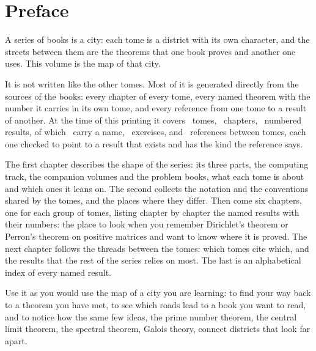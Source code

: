\chapter*{Preface}
A series of books is a city: each tome is a district with its own character, and the streets between them are the
theorems that one book proves and another one uses. This volume is the map of that city.

It is not written like the other tomes. Most of it is generated directly from the sources of the books: every
chapter of every tome, every named theorem with the number it carries in its own tome, and every reference from
one tome to a result of another. At the time of this printing it covers \statTomes\ tomes, \statChapters\
chapters, \statResults\ numbered results, of which \statNamed\ carry a name, \statExercises\ exercises, and
\statCitations\ references between tomes, each one checked to point to a result that exists and has the kind the
reference says.

The first chapter describes the shape of the series: its three parts, the computing track, the companion volumes
and the problem books, what each tome is about and which ones it leans on. The second collects the notation and
the conventions shared by the tomes, and the places where they differ. Then come six chapters, one for each group
of tomes, listing chapter by chapter the named results with their numbers: the place to look when you remember
Dirichlet's theorem or Perron's theorem on positive matrices and want to know where it is proved. The next chapter follows
the threads between the tomes: which tomes cite which, and the results that the rest of the series relies on most.
The last is an alphabetical index of every named result.

Use it as you would use the map of a city you are learning: to find your way back to a theorem you have met, to see
which roads lead to a book you want to read, and to notice how the same few ideas, the prime number theorem, the
central limit theorem, the spectral theorem, Galois theory, connect districts that look far apart.
